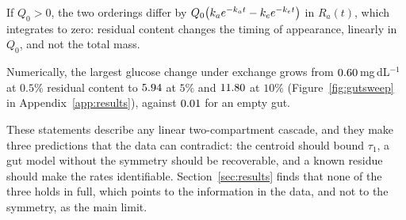 \begin{proposition}
\label{prop:breaking}
If $Q_0>0$, the two orderings differ by $Q_0\bigl(k_a e^{-k_a t}-k_e e^{-k_e t}\bigr)$ in $R_a(t)$, which integrates to zero: residual content changes the timing of appearance, linearly in $Q_0$, and not the total mass.
\end{proposition}

Numerically, the largest glucose change under exchange grows from $0.60$\,mg\,dL$^{-1}$ at $0.5\%$ residual content to $5.94$ at $5\%$ and $11.80$ at $10\%$ (Figure~\ref{fig:gutsweep} in Appendix~\ref{app:results}), against $0.01$ for an empty gut.

These statements describe any linear two-compartment cascade, and they make three predictions that the data can contradict: the centroid should bound $\tau_1$, a gut model without the symmetry should be recoverable, and a known residue should make the rates identifiable.
Section~\ref{sec:results} finds that none of the three holds in full, which points to the information in the data, and not to the symmetry, as the main limit.
